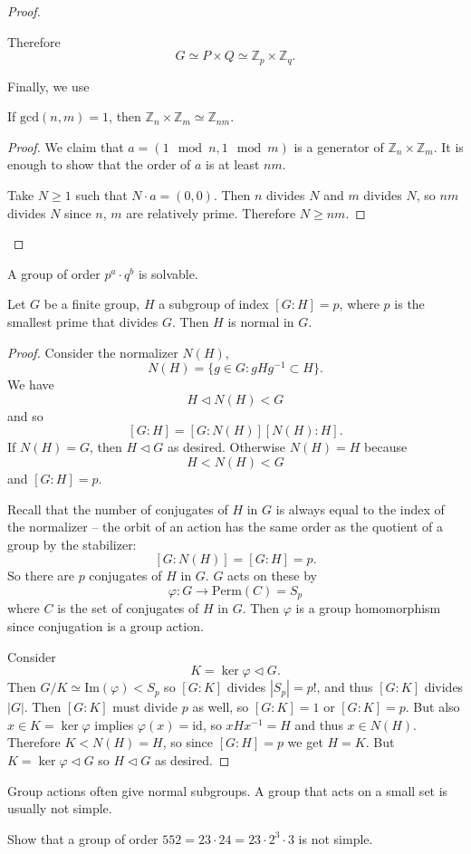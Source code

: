 \documentclass{article}
\begin{document}
\begin{proof}
\begin{enumerate}
{      Therefore
      $$
      G \simeq P \times Q \simeq \mathbb{Z}_p \times \mathbb{Z}_q.
      $$

      Finally, we use
      \begin{lemma}
        If $\mathrm{gcd}(n, m) = 1$, then
        $\mathbb{Z}_n \times \mathbb{Z}_m \simeq \mathbb{Z}_{nm}$.
      \end{lemma}
      \begin{proof}
        We claim that $a = (1 \mod n, 1 \mod m)$ is a generator of
        $\mathbb{Z}_n \times \mathbb{Z}_m$. It is enough to show that
        the order of $a$ is at least $nm$.
        
        Take $N \geq 1$ such that $N \cdot a = (0, 0)$. Then
        $n$ divides $N$ and $m$ divides $N$, so $nm$ divides $N$ since
        $n$, $m$ are relatively prime. Therefore $N \geq n m$.
      \end{proof}
    }
  \end{enumerate}
\end{proof}

\begin{theorem}
  A group of order $p^a \cdot q^b$ is solvable.
\end{theorem}

\begin{prop}
  Let $G$ be a finite group, $H$ a subgroup of index
  $[G : H] = p$, where $p$ is the smallest prime that divides
  $G$. Then $H$ is normal in $G$.
\end{prop}
\begin{proof}
  Consider the normalizer $N(H)$,
  $$
  N(H) = \{ g \in G :  gHg^{-1} \subset H \}.
  $$
  We have
  $$
  H \triangleleft N(H) < G
  $$
  and so
  $$
  [G : H] = [G : N(H)] [N(H) : H].
  $$
  If $N(H) = G$, then $H \triangleleft G$ as desired.
  Otherwise $N(H) = H$ because
  $$
  H < N(H) < G
  $$
  and $[G : H] = p$.

  Recall that the number of conjugates of $H$ in $G$ is always equal
  to the index of the normalizer -- the orbit of an action has the
  same order as the quotient of a group by the stabilizer:
  $$
  [G : N(H)] = [G : H] = p.
  $$
  So there are $p$ conjugates of $H$ in $G$. $G$ acts on these by
  $$
  \varphi : G \to \mathrm{Perm}(C) = S_p
  $$
  where $C$ is the set of conjugates of $H$ in $G$. Then $\varphi$ is
  a group homomorphism since conjugation is a group action.

  Consider
  $$
  K = \ker \varphi \triangleleft G.
  $$
  Then $G / K \simeq \mathrm{Im}(\varphi) < S_p$ so
  $[G : K]$ divides $|S_p| = p!$, and thus $[G : K]$ divides $|G|$.
  Then $[G:K]$ must divide $p$ as well, so $[G : K] = 1$ or
  $[G : K] = p$. But also $x \in K = \ker \varphi$ implies
  $\varphi(x) = \mathrm{id}$, so $x H x^{-1} = H$ and thus
  $x \in N(H)$. Therefore $K < N(H) = H$, so since 
  $[G : H] = p$ we get $H = K$. But 
  $K = \ker \varphi \triangleleft G$ so $H \triangleleft G$ as desired.
\end{proof}

Group actions often give normal subgroups. A group that acts on a
small set is usually not simple.

\begin{xmpl}
  Show that a group of order 
  $552 = 23 \cdot 24 = 23 \cdot 2^3 \cdot 3$ is not simple. 
\end{xmpl}
\end{document}
